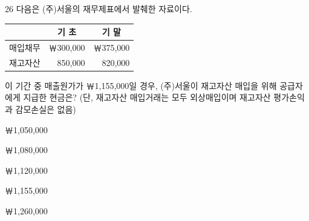\begin{question}{26}
다음은 (주)서울의 재무제표에서 발췌한 자료이다.

{\small\centering
\begin{tabular}{|l|r|r|}
\hline
 & \multicolumn{1}{c|}{기 초} & \multicolumn{1}{c|}{기 말} \\
\hline
매입채무 & ￦300,000 & ￦375,000 \\
재고자산 & 850,000 & 820,000 \\
\hline
\end{tabular}\par}

이 기간 중 매출원가가 ￦1,155,000일 경우, (주)서울이 재고자산 매입을 위해 공급자에게 지급한 현금은? (단, 재고자산 매입거래는 모두 외상매입이며 재고자산 평가손익과 감모손실은 없음) \par
\begin{choices}
  \item ￦1,050,000
  \item ￦1,080,000
  \item ￦1,120,000
  \item ￦1,155,000
  \item ￦1,260,000
\end{choices}
\end{question}
